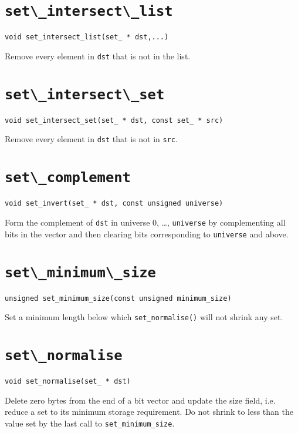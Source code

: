 \section{\protect\verb+set\_intersect\_list+}
\begin{verbatim}
void set_intersect_list(set_ * dst,...)
\end{verbatim}
Remove every element in {\tt dst} that is not in the list.

\section{\protect\verb+set\_intersect\_set+}
\begin{verbatim}
void set_intersect_set(set_ * dst, const set_ * src)
\end{verbatim}
Remove every element in {\tt dst} that is not in {\tt src}.

\section{\protect\verb+set\_complement+}
\begin{verbatim}
void set_invert(set_ * dst, const unsigned universe)
\end{verbatim}
Form the complement of {\tt dst} in universe 0, \ldots, {\tt universe} by
complementing all bits in the vector and then clearing bits
corresponding to {\tt universe} and above.

\section{\protect\verb+set\_minimum\_size+}
\begin{verbatim}
unsigned set_minimum_size(const unsigned minimum_size)
\end{verbatim}
Set a minimum length below which \verb+set_normalise()+ will not shrink
any set.

\section{\protect\verb+set\_normalise+}
\begin{verbatim}
void set_normalise(set_ * dst)
\end{verbatim}
Delete zero bytes from the end of a bit vector and update the size
field, i.e. reduce a set to its minimum storage requirement. Do not
shrink to less than the value set by the last call to \verb+set_minimum_size+.


